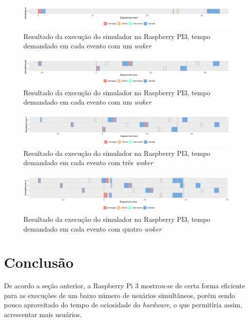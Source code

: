 \documentclass[12pt,english,brazil]{article}
\begin{document}
\begin{figure}[htbp]
  \centering 
  \includegraphics[scale=.4]{paperWSCAD2021/figures/user_PI3_1_worker.png}
  \caption{Resultado da execução do simulador na Raspberry PI3, tempo demandado em cada evento com um \emph{woker}}
  \label{PI3_1wroker}
\end{figure}

\begin{figure}[htbp]
  \centering 
  \includegraphics[scale=.4]{paperWSCAD2021/figures/user_PI3_2_worker.png}
  \caption{Resultado da execução do simulador na Raspberry PI3, tempo demandado em cada evento com um \emph{woker}}
  \label{PI3_2wroker}
\end{figure}

\begin{figure}[htbp]
  \centering 
  \includegraphics[scale=.4]{paperWSCAD2021/figures/user_PI3_3_worker.png}
  \caption{Resultado da execução do simulador na Raspberry PI3, tempo demandado em cada evento com três \emph{woker}}
  \label{PI3_3wroker}
\end{figure}

\begin{figure}[htbp]
  \centering 
  \includegraphics[scale=.4]{paperWSCAD2021/figures/user_PI3_4_worker.png}
  \caption{Resultado da execução do simulador na Raspberry PI3, tempo demandado em cada evento com quatro \emph{woker}}
  \label{PI3_4wroker}
\end{figure}

\section{Conclusão} \label{sec:conlusao}
De acordo a seção anterior, a Raspberry Pi 3 mostrou-se de certa forma eficiente para as execuções de um baixo número de usuários simultâneos, porém sendo pouco aproveitado do tempo de ociosidade do \emph{hardware}, o que permitiria assim, acrescentar mais usuários. 
\end{document}
